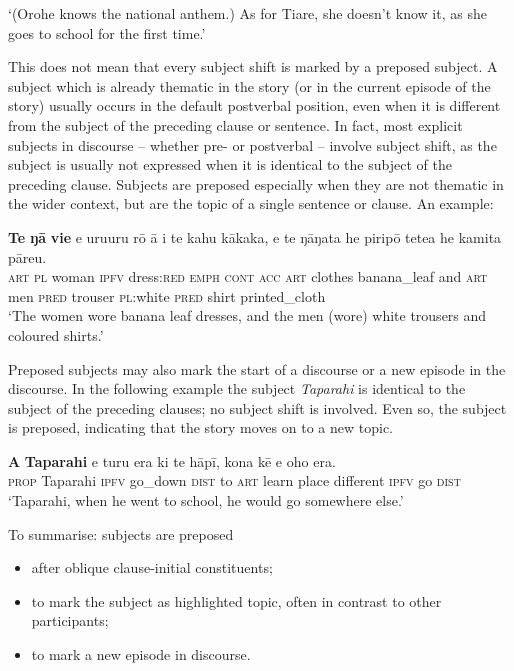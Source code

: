 \glt
‘(Orohe knows the national anthem.) As for Tiare, she doesn’t know it, as she goes to school for the first time.’ \textstyleExampleref{[R334.023]} 
\z

This does not mean that every subject shift is marked by a preposed subject. A subject which is already thematic in the story (or in the current episode of the story) usually occurs in the default postverbal position, even when it is different from the subject of the preceding clause or sentence. In fact, most explicit subjects in discourse – whether pre- or postverbal – involve subject shift, as the subject is usually not expressed when it is identical to the subject of the preceding clause. Subjects are preposed especially when they are not thematic in the wider context, but are the topic of a single sentence or clause. An example:

\ea\label{ex:8.73}
\gll \textbf{Te} \textbf{ŋā} \textbf{vi{\ꞌ}e} e uruuru rō {\ꞌ}ā i te kahu kākaka, {\ꞌ}e te ŋāŋata he piripō tetea he kamita pāreu. \\
\textsc{art} \textsc{pl} woman \textsc{ipfv} dress:\textsc{red} \textsc{emph} \textsc{cont} \textsc{acc} \textsc{art} clothes banana\_leaf and \textsc{art} men \textsc{pred} trouser \textsc{pl}:white \textsc{pred} shirt printed\_cloth \\

\glt
‘The women wore banana leaf dresses, and the men (wore) white trousers and coloured shirts.’ \textstyleExampleref{[R210.132]} 
\z

Preposed subjects may also mark the start of a discourse or a new episode in the discourse. In the following example the subject \textit{Taparahi} is identical to the subject of the preceding clauses; no subject shift is involved. Even so, the subject is preposed, indicating that the story moves on to a new topic. 

\ea\label{ex:8.74}
\gll \textbf{A} \textbf{Taparahi} e turu era ki te hāpī, kona kē e oho era. \\
\textsc{prop} Taparahi \textsc{ipfv} go\_down \textsc{dist} to \textsc{art} learn place different \textsc{ipfv} go \textsc{dist} \\

\glt 
‘Taparahi, when he went to school, he would go somewhere else.’ \textstyleExampleref{[R250.033]} 
\z

To summarise: subjects are preposed 

\begin{itemize}
\item 
after oblique clause-initial constituents;

\item 
to mark the subject as highlighted topic, often in contrast to other participants;

\item 
to mark a new episode in discourse.

\end{itemize}


